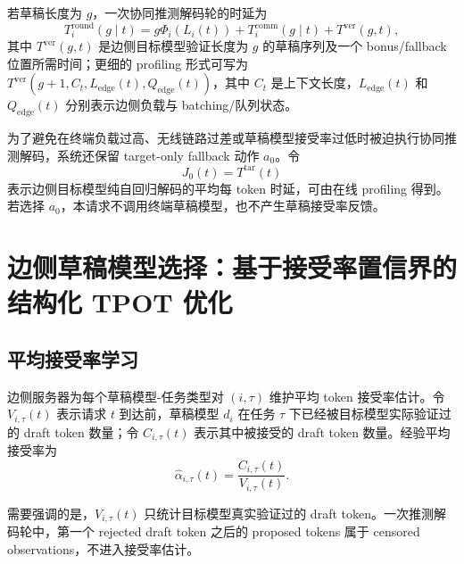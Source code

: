 \documentclass[11pt,a4paper]{ctexart}
\begin{document}
若草稿长度为 $g$，一次协同推测解码轮的时延为
\begin{equation}
    T_i^{\mathrm{round}}(g\mid t)
    =
    g\Phi_i(L_i(t))
    +
    T_i^{\mathrm{comm}}(g\mid t)
    +
    T^{\mathrm{ver}}(g,t),
    \label{eq:round_latency}
\end{equation}
其中 $T^{\mathrm{ver}}(g,t)$ 是边侧目标模型验证长度为 $g$ 的草稿序列及一个 bonus/fallback 位置所需时间；更细的 profiling 形式可写为 $T^{\mathrm{ver}}(g+1,C_t,L_{\mathrm{edge}}(t),Q_{\mathrm{edge}}(t))$，其中 $C_t$ 是上下文长度，$L_{\mathrm{edge}}(t)$ 和 $Q_{\mathrm{edge}}(t)$ 分别表示边侧负载与 batching/队列状态。

为了避免在终端负载过高、无线链路过差或草稿模型接受率过低时被迫执行协同推测解码，系统还保留 target-only fallback 动作 $a_0$。令
\begin{equation}
    J_0(t)=T^{\mathrm{tar}}(t)
    \label{eq:fallback_tpot}
\end{equation}
表示边侧目标模型纯自回归解码的平均每 token 时延，可由在线 profiling 得到。若选择 $a_0$，本请求不调用终端草稿模型，也不产生草稿接受率反馈。

\section{边侧草稿模型选择：基于接受率置信界的结构化 TPOT 优化}
\label{sec:model_selection}

\subsection{平均接受率学习}
\label{subsec:mean_acceptance}

边侧服务器为每个草稿模型-任务类型对 $(i,\tau)$ 维护平均 token 接受率估计。令 $V_{i,\tau}(t)$ 表示请求 $t$ 到达前，草稿模型 $d_i$ 在任务 $\tau$ 下已经被目标模型实际验证过的 draft token 数量；令 $C_{i,\tau}(t)$ 表示其中被接受的 draft token 数量。经验平均接受率为
\begin{equation}
    \widehat{\alpha}_{i,\tau}(t)
    =
    \frac{C_{i,\tau}(t)}{V_{i,\tau}(t)}.
    \label{eq:empirical_acceptance}
\end{equation}

需要强调的是，$V_{i,\tau}(t)$ 只统计目标模型真实验证过的 draft token。一次推测解码轮中，第一个 rejected draft token 之后的 proposed tokens 属于 censored observations，不进入接受率估计。
\end{document}
